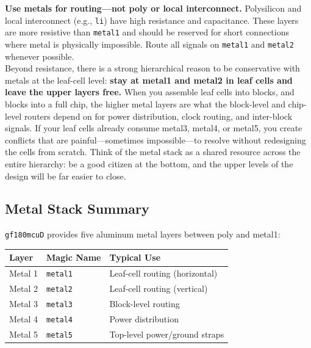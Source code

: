 \documentclass[11pt]{article}
\begin{document}
\begin{tipbox}
\textbf{Use metals for routing---not poly or local interconnect.}
Polysilicon and local interconnect (e.g., \texttt{li}) have
high resistance and capacitance.
These layers are more resistive
than \texttt{metal1} and should be reserved for short connections
where metal is physically impossible.
Route all signals on \texttt{metal1} and \texttt{metal2} whenever
possible.\\

Beyond resistance, there is a strong hierarchical reason to be
conservative with metals at the leaf-cell level: \textbf{stay at
metal1 and metal2 in leaf cells and leave the upper layers free.}
When you assemble leaf cells into blocks, and blocks into a full chip,
the higher metal layers are what the block-level and chip-level
routers depend on for power distribution, clock routing, and
inter-block signals.
If your leaf cells already consume metal3, metal4, or metal5, you
create conflicts that are painful---sometimes impossible---to resolve
without redesigning the cells from scratch.
Think of the metal stack as a shared resource across the entire
hierarchy: be a good citizen at the bottom, and the upper levels of
the design will be far easier to close.
\end{tipbox}

\subsection{Metal Stack Summary}

\texttt{gf180mcuD} provides five aluminum metal layers between poly and metal1:
\begin{center}
\begin{tabular}{@{}lll@{}}
\toprule
\textbf{Layer} & \textbf{Magic Name} & \textbf{Typical Use} \\
\midrule
Metal 1            & \texttt{metal1} & Leaf-cell routing (horizontal) \\
Metal 2            & \texttt{metal2} & Leaf-cell routing (vertical) \\
Metal 3            & \texttt{metal3} & Block-level routing \\
Metal 4            & \texttt{metal4} & Power distribution \\
Metal 5            & \texttt{metal5} & Top-level power/ground straps \\
\bottomrule
\end{tabular}
\end{center}
\end{document}
